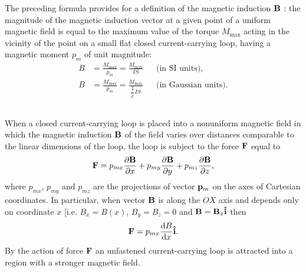 The preceding formula provides for a definition of the magnetic induction $\vb{B}$ : the magnitude of the magnetic induction vector at a given point of a uniform magnetic field is equal to the maximum value of the torque $M_{\text{max}}$ acting in the vicinity of the point on a small flat closed current-carrying loop, having a magnetic moment ${p}_{m}$ of unit magnitude:
\begin{align*}%
B & = \frac{M_{\text{max}}}{{p}_{m}} = \frac{M_{\text{max}}}{IS} &&  \text{(in SI units),} \\
B & =  \frac{M_{\text{max}}}{{p}_{m}} = \frac{M_{\text{max}}}{\dfrac{1}{c}IS} &&  \text{(in Gaussian units).}
\end{align*}

\subsection{}\label{23.4.3} When a closed current-carrying loop is placed into a nonuniform magnetic field  in which the magnetic induction $\vb{B}$ of the field varies over distances comparable to the linear dimensions of the loop, the loop is subject to the force $\vb{F}$ equal to
\begin{equation*}%
\vb{F} = p_{mx} \pdv{\vb{B}}{x} + p_{my} \pdv{\vb{B}}{y} + p_{mz} \pdv{\vb{B}}{z},
\end{equation*}
where $p_{mx}$, $p_{my}$ and $p_{mz}$ are the projections of vector $\vb{p}_{m}$ on the axes of Cartesian coordinates. In particular, when vector $\vb{B}$ is along the $OX$ axis and depends only on coordinate $x$ [i.e. $B_{x} = B(x)$, $B_{y}= B_{z} = 0$ and $\vb{B} = \vb{B}_{x}\vu{i}$ then
\begin{equation*}%
\vb{F} = p_{mx} \dv{{B}}{x} \vu{i}.
\end{equation*}
By the action of force $\vb{F}$ an unfastened current-carrying loop is attracted into a region with a stronger magnetic field.

